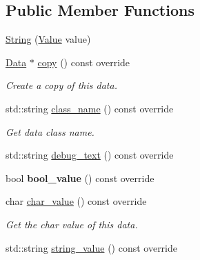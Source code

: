 \subsection*{Public Member Functions}
\begin{DoxyCompactItemize}
\item 
\hyperlink{classcreek_1_1_string_a9ff9ff83c6f527e3cac441f7ae49a5bf}{String} (\hyperlink{classcreek_1_1_string_a1bdb539e8a99ae376aa43e64004ab9ca}{Value} value)
\item 
\hyperlink{classcreek_1_1_data}{Data} $\ast$ \hyperlink{classcreek_1_1_string_afd1110ab027335cd3bc13f4ac7e3900b}{copy} () const  override\hypertarget{classcreek_1_1_string_afd1110ab027335cd3bc13f4ac7e3900b}{}\label{classcreek_1_1_string_afd1110ab027335cd3bc13f4ac7e3900b}

\begin{DoxyCompactList}\small\item\em Create a copy of this data. \end{DoxyCompactList}\item 
std\+::string \hyperlink{classcreek_1_1_string_aa245c7a1f76b26faef75cdb15d97ac18}{class\+\_\+name} () const  override\hypertarget{classcreek_1_1_string_aa245c7a1f76b26faef75cdb15d97ac18}{}\label{classcreek_1_1_string_aa245c7a1f76b26faef75cdb15d97ac18}

\begin{DoxyCompactList}\small\item\em Get data class name. \end{DoxyCompactList}\item 
std\+::string \hyperlink{classcreek_1_1_string_aef637e0c37e6ff5dcf7b59a18d729603}{debug\+\_\+text} () const  override
\item 
bool {\bfseries bool\+\_\+value} () const  override\hypertarget{classcreek_1_1_string_a65242c8305cbdf9f30bd11ea37ec0895}{}\label{classcreek_1_1_string_a65242c8305cbdf9f30bd11ea37ec0895}

\item 
char \hyperlink{classcreek_1_1_string_a618e4475a8b2c68f4a945fc49f3e1ac7}{char\+\_\+value} () const  override\hypertarget{classcreek_1_1_string_a618e4475a8b2c68f4a945fc49f3e1ac7}{}\label{classcreek_1_1_string_a618e4475a8b2c68f4a945fc49f3e1ac7}

\begin{DoxyCompactList}\small\item\em Get the char value of this data. \end{DoxyCompactList}\item 
std\+::string \hyperlink{classcreek_1_1_string_a21147bb798f76588ee1c949c0f7962b6}{string\+\_\+value} () const  override\hypertarget{classcreek_1_1_string_a21147bb798f76588ee1c949c0f7962b6}{}\label{classcreek_1_1_string_a21147bb798f76588ee1c949c0f7962b6}


\end{DoxyCompactItemize}

